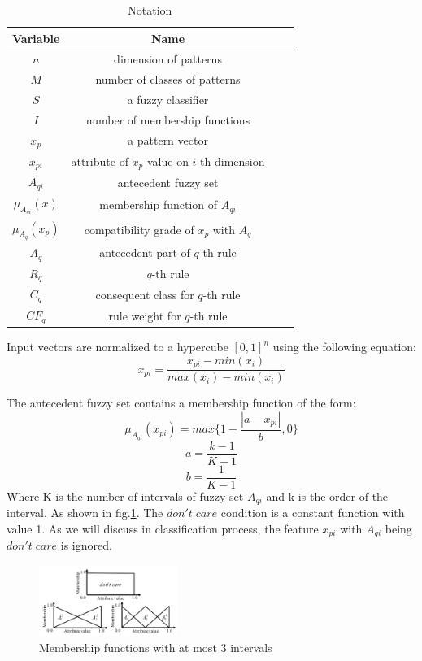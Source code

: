 \documentclass[conference]{IEEEtran}
\begin{document}
  \begin{table}[H]
    \caption{Notation}
    \centering
      \begin{tabular}{cccc}
      \toprule
      Variable&Name\\
      \midrule
      $n$&dimension of patterns\\
      $M$&number of classes of patterns\\
      $S$&a fuzzy classifier\\
      $I$&number of membership functions\\
      $x_p$&a pattern vector\\
      $x_{pi}$&attribute of $x_p$ value on $i$-th dimension\\
      $A_{qi}$&antecedent fuzzy set\\
      $\mu_{A_{qi}}(x)$&membership function of $A_{qi}$\\
      $\mu_{A_{q}}(x_p)$&compatibility grade of $x_p$ with $A_q$\\
      $A_q$&antecedent part of $q$-th rule\\
      
      $R_q$&$q$-th rule\\
      $C_q$&consequent class for $q$-th rule\\
      $CF_q$&rule weight for $q$-th rule\\
  \bottomrule
  \end{tabular}
  \label{table:1}
  \end{table}
  Input vectors are normalized to a hypercube $[0,1]^n$ using the following equation:
  $$x_{pi}=\frac{x_{pi}-min(x_{i})}{max(x_{i})-min(x_{i})}$$

  The antecedent fuzzy set contains a membership function of the form:
  $$\mu_{A_{qi}}(x_{pi}) =max\{1-\frac{|a-x_{pi}|}
  {b},0\}$$
  $$a=\frac{k-1}{K-1}$$
  $$b=\frac{1}{K-1}$$
  Where K is the number of intervals of fuzzy set $A_{qi}$ and k is the order of the interval. As shown in fig.\ref{fig:mfunc}. The $don't\;care$ condition is a constant function with value 1. As we will discuss in classification process, the feature $x_{pi} $ with $A_{qi}$ being $don't\;care$ is ignored.

  \begin{figure}[H]
    \centering
    \includegraphics[width = 0.4\textwidth]{figures/mfunc.png}
    \caption{Membership functions with at most 3 intervals}
    \label{fig:mfunc}
  \end{figure}
\end{document}
